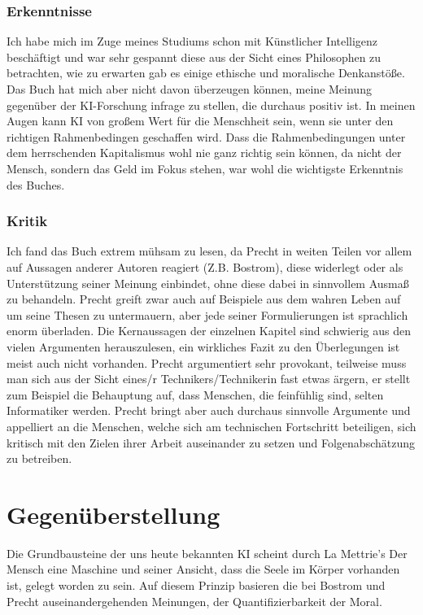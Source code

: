 \documentclass[twoside, a4paper, DIV=11, open=any, bibliography=totoc]{scrbook}
\newcommand{\Quote}[1]{\glqq #1\grqq{}}
\begin{document}
\subsection{Erkenntnisse} \label{sec:literkenntnis3}
Ich habe mich im Zuge meines Studiums schon mit Künstlicher Intelligenz beschäftigt und war sehr gespannt diese aus der Sicht eines Philosophen zu betrachten, wie zu erwarten gab es einige ethische und moralische Denkanstöße. Das Buch hat mich aber nicht davon überzeugen können, meine Meinung gegenüber der KI-Forschung infrage zu stellen, die durchaus positiv ist. In meinen Augen kann KI von großem Wert für die Menschheit sein, wenn sie unter den richtigen Rahmenbedingen geschaffen wird. Dass die Rahmenbedingungen unter dem herrschenden Kapitalismus wohl nie ganz richtig sein können, da nicht der Mensch, sondern das Geld im Fokus stehen, war wohl die wichtigste Erkenntnis des Buches.

\subsection{Kritik} \label{sec:litkritik3}
Ich fand das Buch extrem mühsam zu lesen, da Precht in weiten Teilen vor allem auf Aussagen anderer Autoren reagiert (Z.B. Bostrom), diese widerlegt oder als Unterstützung seiner Meinung einbindet, ohne diese dabei in sinnvollem Ausmaß zu behandeln. Precht greift zwar auch auf Beispiele aus dem wahren Leben auf um seine Thesen zu untermauern, aber jede seiner Formulierungen ist sprachlich enorm überladen. Die Kernaussagen der einzelnen Kapitel sind schwierig aus den vielen Argumenten herauszulesen, ein wirkliches Fazit zu den Überlegungen ist meist auch nicht vorhanden. Precht argumentiert sehr provokant, teilweise muss man sich aus der Sicht eines/r Technikers/Technikerin fast etwas ärgern, er stellt zum Beispiel die Behauptung auf, dass Menschen, die feinfühlig sind, selten Informatiker werden. Precht bringt aber auch durchaus sinnvolle Argumente und appelliert an die Menschen, welche sich am technischen Fortschritt beteiligen, sich kritisch mit den Zielen ihrer Arbeit auseinander zu setzen und Folgenabschätzung zu betreiben.


\chapter{Gegenüberstellung} \label{sec:litgegenueber}
Die Grundbausteine der uns heute bekannten KI scheint durch La Mettrie's \Quote{Der Mensch eine Maschine} und seiner Ansicht, dass die Seele im Körper vorhanden ist, gelegt worden zu sein. 
Auf diesem Prinzip basieren die bei Bostrom und Precht auseinandergehenden Meinungen, der Quantifizierbarkeit der Moral. 
\end{document}
